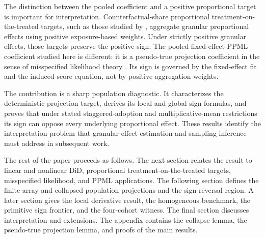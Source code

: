 The distinction between the pooled coefficient and a positive proportional target is important for interpretation. Counterfactual-share proportional treatment-on-the-treated targets, such as those studied by \citet{MoreauKastler2025PTT}, aggregate granular proportional effects using positive exposure-based weights. Under strictly positive granular effects, those targets preserve the positive sign. The pooled fixed-effect PPML coefficient studied here is different: it is a pseudo-true projection coefficient in the sense of misspecified likelihood theory \citep{White1982MisspecifiedML,GourierouxMonfortTrognon1984Theory,GourierouxMonfortTrognon1984Poisson}. Its sign is governed by the fixed-effect fit and the induced score equation, not by positive aggregation weights.

The contribution is a sharp population diagnostic. It characterizes the deterministic projection target, derives its local and global sign formulas, and proves that under stated staggered-adoption and multiplicative-mean restrictions its sign can oppose every underlying proportional effect. These results identify the interpretation problem that granular-effect estimation and sampling inference must address in subsequent work.

The rest of the paper proceeds as follows. The next section relates the result to linear and nonlinear DiD, proportional treatment-on-the-treated targets, misspecified likelihood, and PPML applications. The following section defines the finite-array and collapsed population projections and the sign-reversal region. A later section gives the local derivative result, the homogeneous benchmark, the primitive sign frontier, and the four-cohort witness. The final section discusses interpretation and extensions. The appendix contains the collapse lemma, the pseudo-true projection lemma, and proofs of the main results.

